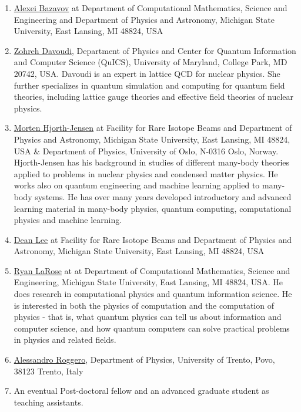 \documentclass[superscriptaddress,amsmath,amssymb,aps,floatfix]{revtex4-2}
\begin{document}
\begin{enumerate}
\item 
\href{https://directory.natsci.msu.edu/Directory/Profiles/Person/101033}{Alexei
Bazavov} at Department of Computational Mathematics, Science and
Engineering and Department of Physics and Astronomy, Michigan State
University, East Lansing, MI 48824, USA
\item
  \href{https://umdphysics.umd.edu/people/faculty/current/item/927-davoudi.html}{Zohreh
  Davoudi}, Department of Physics and Center for Quantum Information and Computer Science (QuICS), University of Maryland, College Park,
  MD 20742, USA. Davoudi is an expert in lattice QCD for nuclear physics. She further
  specializes in quantum simulation and computing for quantum field
  theories, including lattice gauge theories and effective field
  theories of nuclear physics.

\item
  \href{http://mhjgit.github.io/info/doc/web/}{Morten Hjorth-Jensen} at
  Facility for Rare Isotope Beams and Department of Physics and
  Astronomy, Michigan State University, East Lansing, MI 48824, USA \&
  Department of Physics, University of Oslo, N-0316 Oslo, Norway. Hjorth-Jensen has his background in studies of different many-body theories applied to problems in nuclear physics and condensed matter physics. He works also on quantum engineering and machine learning applied to many-body systems. He has over many years developed introductory and advanced learning material in many-body physics, quantum computing, computational physics and machine learning.
\item
  \href{https://frib.msu.edu/for-students/faculty/lee-profile}{Dean Lee}
  at Facility for Rare Isotope Beams and Department of Physics and
  Astronomy, Michigan State University, East Lansing, MI 48824, USA
\item
  \href{https://www.ryanlarose.com/}{Ryan LaRose} at at Department of
  Computational Mathematics, Science and Engineering, Michigan State
  University, East Lansing, MI 48824, USA. He does research in computational physics and quantum information science. He is  interested in both the physics of computation and the computation of physics - that is, what quantum physics can tell us about information and computer science, and how quantum computers can solve practical problems in physics and related fields.
\item
  \href{https://webapps.unitn.it/du/en/Persona/PER0016084/Didattica}{Alessandro
  Roggero}, Department of Physics, University of Trento, Povo, 38123
  Trento, Italy
\item
  An eventual Post-doctoral fellow and an advanced graduate student as
  teaching assistants.
\end{enumerate}
\end{document}
